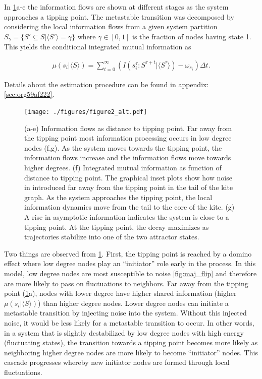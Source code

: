\documentclass[a4paper, 11pt, twocolumn]{article}
\begin{document}
In \cref{fig:kite_res}{a-e} the  information flows are shown
at  different  stages as  the  system  approaches a  tipping
point.   The  metastable   transition   was  decomposed   by
considering the local information  flows from a given system
partition \(S_{\gamma} =  \{S' \subseteq S |  \langle S' \rangle = \gamma\}\)  where \(\gamma \in
[0,1]\) is the fraction of nodes having state 1. This yields
the conditional integrated mutual information as

\begin{equation}
\label{eq:adj_imi_conditional}
\begin{split}
\mu(s_i  | \langle  S \rangle) =  \sum_{t = 0}^\infty (I(s_i^{\tau} : S^{\tau + t} | \langle S^{\tau} \rangle) - \omega_{s_i}) \Delta t.
\end{split}
\end{equation}

Details  about  the estimation  procedure  can  be found  in
appendix: \ref{sec:org59af222}.

\begin{figure}[th]
\centering
\texttt{[image: ./figures/figure2\_alt.pdf]}
\caption{\label{fig:kite_res}(a-e) Information flows as distance to tipping point. Far away from the tipping point most information processing occurs in low degree nodes (f,g). As the system moves towards the tipping point, the information flows increase and the information flows move towards higher degrees. (f) Integrated mutual information as function of distance to tipping point. The graphical inset plots show how noise in introduced far away from the tipping point in the tail of the kite graph. As the system approaches the tipping point, the local information dynamics move from the tail to the core of the kite. (g) A rise in asymptotic information indicates the system is close to a tipping point. At the tipping point, the decay maximizes as trajectories stabilize into one of the two attractor states.}
\end{figure}

Two things are observed from \cref{fig:kite_res}. First, the
tipping point is reached by a domino effect where low degree
nodes play an ``initiator'' role early in the process. In this
model,  low  degree  nodes  are most  susceptible  to  noise
\cref{fig:maj_flip} and therefore are more likely to pass on
fluctuations to  neighbors. Far away from  the tipping point
(\cref{fig:kite_res}{a}),  nodes  with   lower  degree  have
higher shared information  (higher \(\mu(s_i | \langle  S \rangle)\)) than
higher  degree  nodes. Lower  degree  nodes  can initiate  a
metastable transition  by injecting  noise into  the system.
Without this injected  noise, it would be less  likely for a
metastable transition to occur. In  other words, in a system
that is slightly destabilized by  low degree nodes with high
energy  (fluctuating  states),   the  transition  towards  a
tipping  point becomes  more  likely  as neighboring  higher
degree nodes  are more  likely to become  ``initiator'' nodes.
This  cascade progresses  whereby  new  initiator nodes  are
formed through local fluctuations.
\end{document}
